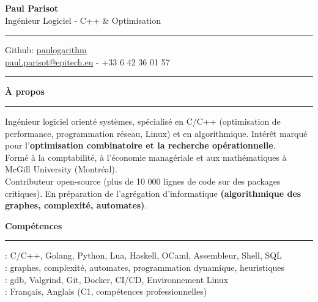 \documentclass[9pt]{extarticle}
\begin{document}
\begin{center}
	{\huge\bfseries Paul Parisot}
	\\[4pt]
	{\Large Ingénieur Logiciel - C++ \& Optimisation}
	\\
\end{center}

\par\vspace{-5pt}
\rule{\linewidth}{0.4pt}
\par\vspace{-5pt}

\begin{center}
	Github: \href{https://github.com/paulogarithm}{paulogarithm}
	\\
	\href{mailto:paul.parisot@epitech.eu}{paul.parisot@epitech.eu} - +33 6 42 36 01 57
	\\
\end{center}

\par\vspace{-10pt}
\rule{\linewidth}{0.4pt}
\par\vspace{7pt}

{\large\bfseries À propos}
\par\vspace{-8pt}
\rule{\linewidth}{0.4pt}
\par\vspace{5pt}

Ingénieur logiciel orienté systèmes, spécialisé en C/C++ (optimisation de performance, programmation réseau, Linux) et en algorithmique. Intérêt marqué pour l'{\bfseries optimisation combinatoire et la recherche opérationnelle}.
\\
Formé à la comptabilité, à l'économie managériale et aux mathématiques à McGill University (Montréal).
\\
Contributeur open-source (plus de 10 000 lignes de code sur des packages critiques). En préparation de l'agrégation d'informatique {\bfseries (algorithmique des graphes, complexité, automates)}.
\par\vspace{5pt}

{\large\bfseries Compétences}
\par\vspace{-8pt}
\rule{\linewidth}{0.4pt}
\par\vspace{5pt}

\hspace*{5pt}{\bfseries Maîtrise}: C/C++, Golang, Python, Lua, Haskell, OCaml, Assembleur, Shell, SQL
\\
\hspace*{5pt}{\bfseries Algorithmique}: graphes, complexité, automates, programmation dynamique, heuristiques
\\
\hspace*{5pt}{\bfseries Outils}: gdb, Valgrind, Git, Docker, CI/CD, Environnement Linux
\\
\hspace*{5pt}{\bfseries Langues}: Français, Anglais (C1, compétences professionnelles)
\end{document}
